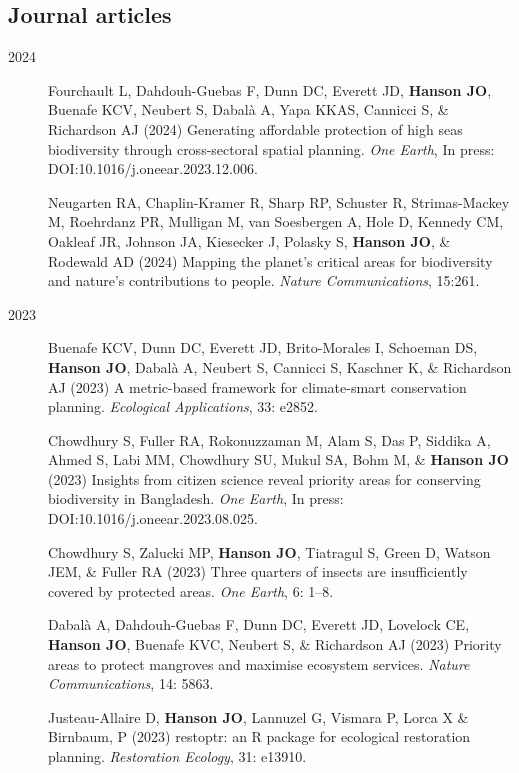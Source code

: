 \documentclass[12pt,a4paper]{article}
\begin{document}
\subsection*{Journal articles}
\begin{description}

\item[2024] Fourchault L, Dahdouh-Guebas F, Dunn DC, Everett JD, \textbf{Hanson JO}, Buenafe KCV, Neubert S, Dabalà A, Yapa KKAS, Cannicci S, \& Richardson AJ (2024) Generating affordable protection of high seas biodiversity through cross-sectoral spatial planning. \textit{One Earth}, In press: DOI:10.1016/j.oneear.2023.12.006.

\item[] Neugarten RA, Chaplin-Kramer R, Sharp RP, Schuster R, Strimas-Mackey M, Roehrdanz PR, Mulligan M, van Soesbergen A, Hole D, Kennedy CM, Oakleaf JR, Johnson JA, Kiesecker J, Polasky S, \textbf{Hanson JO}, \& Rodewald AD (2024) Mapping the planet's critical areas for biodiversity and nature's contributions to people. \textit{Nature Communications}, 15:261.

\item[2023] Buenafe KCV, Dunn DC, Everett JD, Brito-Morales I, Schoeman DS, \textbf{Hanson JO}, Dabalà A, Neubert S, Cannicci S, Kaschner K, \& Richardson AJ (2023) A metric-based framework for climate-smart conservation planning. \textit{Ecological Applications}, 33: e2852.

\item[] Chowdhury S, Fuller RA, Rokonuzzaman M, Alam S, Das P, Siddika A, Ahmed S, Labi MM, Chowdhury SU, Mukul SA, Bohm M, \& \textbf{Hanson JO} (2023) Insights from citizen science reveal priority areas for conserving biodiversity in Bangladesh. \textit{One Earth}, In press: DOI:10.1016/j.oneear.2023.08.025.

\item[] Chowdhury S, Zalucki MP, \textbf{Hanson JO}, Tiatragul S, Green D, Watson JEM, \& Fuller RA (2023) Three quarters of insects are insufficiently covered by protected areas. \textit{One Earth}, 6: 1--8.

\item[] Dabalà A, Dahdouh-Guebas F, Dunn DC, Everett JD, Lovelock CE, \textbf{Hanson JO}, Buenafe KVC, Neubert S, \& Richardson AJ (2023) Priority areas to protect mangroves and maximise ecosystem services. \textit{Nature Communications}, 14: 5863.

\item[] Justeau-Allaire D, \textbf{Hanson JO}, Lannuzel G, Vismara P, Lorca X \& Birnbaum, P (2023) restoptr: an R package for ecological restoration planning. \textit{Restoration Ecology}, 31: e13910.


\end{description}
\end{document}
